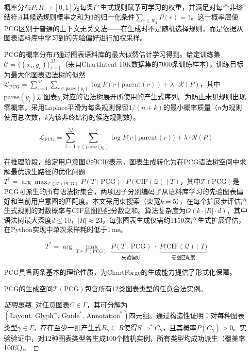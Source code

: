 概率分布$P: R \to [0, 1]$为每条产生式规则赋予可学习的权重，并满足对每个非终结符$A$其候选规则概率之和为1的归一化条件$\sum_{r \in R_A} P(r) = 1$。这一概率层使PCG区别于普通的上下文无关文法——在生成时不是随机选择规则，而是依据从图表语料库中学习到的先验偏好进行加权采样。

PCG的概率分布$P$通过图表语料库的最大似然估计学习得到。给定训练集$\mathcal{C} = \{(x_i, y_i)\}_{i=1}^{M}$（来自ChartIntent-10K数据集的7000条训练样本），训练目标为最大化图表语法树的似然$\mathcal{L}_{\text{PCG}} = \sum_{i=1}^{M} \sum_{r \in \text{parse}(y_i)} \log P(r \mid \text{parent}(r)) + \lambda \cdot \mathcal{R}(P)$，其中$\text{parse}(y_i)$是图表$y_i$对应的语法树展开所使用的产生式序列。为防止未见规则出现零概率，采用Laplace平滑为每条规则保留$1/(n+k)$的最小概率质量（$n$为规则使用总次数，$k$为该非终结符的候选规则数）。

\begin{equation}\label{eq:pcloss}
    \mathcal{L}_{\text{PCG}} = \sum_{i=1}^{M} \sum_{r \in \text{parse}(y_i)} \log P\big(r \mid \text{parent}(r)\big) + \lambda \cdot \mathcal{R}(P)
\end{equation}

在推理阶段，给定用户意图$\mathcal{Q}$的CIF表示，图表生成转化为在PCG语法树空间中求解最优派生路径的优化问题$T^* = \arg\max_{T \in \mathcal{T}(\text{PCG})} P(T \mid \text{PCG}) \cdot P(\text{CIF}(\mathcal{Q}) \mid T)$，其中$\mathcal{T}(\text{PCG})$是PCG可派生的所有语法树集合，两项因子分别编码了从语料库学习的先验图表偏好和当前用户意图的匹配度。本文采用束搜索（束宽$k=5$），在每个扩展步评估产生式规则的对数概率与CIF意图匹配分数之和。算法复杂度为$O(k \cdot |R| \cdot d)$，其中语法树最大深度$d \leq 10$，$|R| \approx 23$，每张图表生成仅需约1150次产生式扩展评估，在Python实现中单次采样耗时低于1\,ms。

\begin{equation}\label{eq:conditional}
    T^* = \arg\max_{T \in \mathcal{T}(\text{PCG})} \;
          \underbrace{P(T \mid \text{PCG})}_{\text{先验偏好}} \;\cdot\;
          \underbrace{P\big(\text{CIF}(\mathcal{Q}) \mid T\big)}_{\text{意图匹配度}}
\end{equation}

PCG具备两条基本的理论性质，为ChartForge的生成能力提供了形式化保障。
\begin{theorem}[完备性]\label{thm:completeness}
PCG的生成空间$\mathcal{T}(\text{PCG})$包含所有12类图表类型的任意合法实例。
\end{theorem}

\begin{proof}[证明思路]
对任意图表$C \in \Gamma$，其可分解为$(\text{Layout},\, \text{Glyph}^+,\, \text{Guide}^*,\, \text{Annotation}^*)$四元组。通过构造性证明：对每种图表类型$\gamma \in \Gamma$，存在至少一组产生式$R_\gamma \subseteq R$使得$S \Rightarrow^* C_\gamma$，且其概率$P(C_\gamma) > 0$。实验验证中，对12种图表类型各生成100个随机实例，所有类型均成功派生（覆盖率100\%）。
\end{proof}

